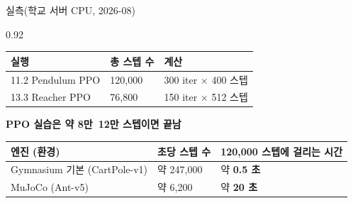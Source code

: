 \begin{frame}{실측(학교 서버 CPU, 2026-08)}
\begin{center}\begin{varwidth}{0.92\textwidth}
  
  \begin{tabular}{@{}p{4.4cm}p{3.0cm}p{6.0cm}@{}}
    \toprule
    실행 & 총 스텝 수 & 계산 \\
    \midrule
    11.2 Pendulum PPO & 120,000 & 300 iter $\times$ 400 스텝 \\
    13.3 Reacher PPO & 76,800 & 150 iter $\times$ 512 스텝 \\
    \bottomrule
  \end{tabular}
  \textbf{PPO 실습은 약 8만~12만 스텝이면 끝남}
  \begin{tabular}{@{}p{5.6cm}p{3.6cm}p{4.8cm}@{}}
    \toprule
    엔진 (환경) & 초당 스텝 수 & 120,000 스텝에 걸리는 시간 \\
    \midrule
    Gymnasium 기본 (CartPole-v1) & 약 247,000 & 약 \textbf{0.5 초} \\
    MuJoCo (Ant-v5) & 약 6,200 & 약 \textbf{20 초} \\
    \bottomrule
  \end{tabular}
\end{varwidth}\end{center}
\end{frame}
